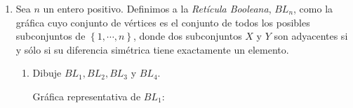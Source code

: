 \documentclass{article}
\newcommand{\set}[1]{%
\left\{ #1 \right\}%
}
\begin{document}
\begin{enumerate}
\begin{proof}
\begin{itemize}
      Sabemos que las entradas de cada columna de $M_{1}$ son igual a 1,
      que son las flechas $e_{j}$ con un vértice llamado \textit{cabeza de la flecha}.
      Por otro lado, las entradas del \textit{i-ésimo} renglón de $M_{1}$
      suman $d^{-}(v_{i})$, ya que las entradas corresponden a todas las
      flechas de las cuales $v_{i}$ es cabeza de dicha flecha. 
      
      Entonces, tenemos que:
      \begin{equation*}
        \begin{split}
          \abs{A_{D}} & = \sum_{j=1}^{\abs{A}} \sum_{i=1}^{\abs{V}} M^{-}_{ij} \\
          & = \sum_{i=1}^{\abs{V}} \sum_{j=1}^{\abs{A}} M^{-}_{ij} \\
          & = \sum_{i=1}^{\abs{V}} d^{-}(v_{i}) \\
          & = \sum_{v \in V} d^{-}(v)
        \end{split}
      \end{equation*}
    \end{itemize}
    Por lo tanto, queda demostrado que:
    \[
    \displaystyle \sum_{v \in V_D} d^+(v) = \sum_{v \in V_D} d^-(v) = |A_D|
    \]
    \end{proof}

  \item  Sea $n$ un entero positivo. Definimos a la {\em Ret\'icula Booleana},
    $BL_n$, como la gr\'afica cuyo conjunto de vértices es el conjunto de todos
    los posibles subconjuntos de $\set{1, \cdots, n}$, donde dos subconjuntos
    $X$ y $Y$ son adyacentes si y s\'olo si su diferencia sim\'etrica tiene
    exactamente un elemento.
    
    \begin{enumerate}
    \item Dibuje $BL_1, BL_2, BL_3$ y $BL_4$.
      
      Gráfica representativa de $BL_1$:
      \begin{center}
      \end{center}
      

\end{enumerate}
\end{enumerate}
\end{document}
